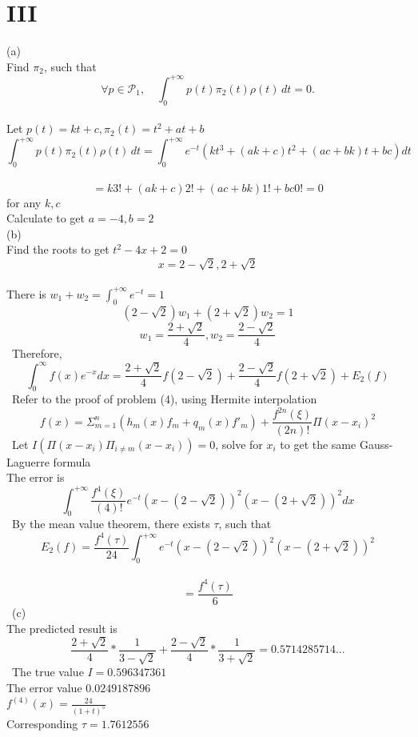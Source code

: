 \documentclass[a4paper]{article}
\begin{document}
\section*{III}
(a)\\
Find \(\pi_2\), such that\\
\[ \forall p \in \mathcal{P}_1, \quad \int_{0}^{+\infty} p(t) \pi_2(t) \rho(t) \, dt = 0. \]\\
Let \(p(t)=kt+c,\pi_2(t)=t^2+at+b\)\\
\[ \int_{0}^{+\infty} p(t) \pi_2(t) \rho(t) \, dt=\int_{0}^{+\infty} e^{-t} (kt^3+(ak+c)t^2+(ac+bk)t+bc)dt \]\\
\[ =k 3!+(ak+c)2!+(ac+bk)1!+bc0!=0 \] for any \(k,c\)\\
Calculate to get \(a=-4,b=2\)\\
(b)\\
Find the roots to get \(t^2-4x+2=0\)\\
\[ x=2-\sqrt{2},2+\sqrt{2} \]\\
There is \(w_1+w_2=\int_{0}^{+\infty}e^{-t}=1\)\\
\[ (2-\sqrt{2})w_1+(2+\sqrt{2})w_2=1\]
\[ w_1=\frac{2+\sqrt{2}}{4},w_2=\frac{2-\sqrt{2}}{4}\]\
Therefore,\\
\[ \int_{0}^{\infty}f(x)e^{-x}dx=\frac{2+\sqrt{2}}{4}f(2-\sqrt{2})+\frac{2-\sqrt{2}}{4}f(2+\sqrt{2})+E_2(f)\]\
Refer to the proof of problem (4), using Hermite interpolation\\
\[ f(x)=\Sigma_{m=1}^{n}(h_m(x)f_m+q_m(x)f'_m)+\frac{f^{2n}(\xi)}{(2n)!}\Pi(x-x_i)^2\]\
Let \(I(\Pi(x-x_i)\Pi_{i\neq m}(x-x_i))=0\), solve for \(x_i\) to get the same Gauss-Laguerre formula\\
The error is\\
\[ \int_{0}^{+\infty}\frac{f^{4}(\xi)}{(4)!}e^{-t}(x-(2-\sqrt{2}))^2(x-(2+\sqrt{2}))^2dx\]\
By the mean value theorem, there exists \(\tau\), such that\\
\[ E_2(f)=\frac{f^{4}(\tau)}{24}\int_{0}^{+\infty}e^{-t}(x-(2-\sqrt{2}))^2(x-(2+\sqrt{2}))^2\]\
\[ =\frac{f^{4}(\tau)}{6}\]\
(c)\\
The predicted result is\\
\[ \frac{2+\sqrt{2}}{4}*\frac{1}{3-\sqrt{2}}+\frac{2-\sqrt{2}}{4}*\frac{1}{3+\sqrt{2}}=0.5714285714...\]\
The true value \( I =0.596347361\)\\
The error value \(0.0249187896\)\\
\(f^{(4)}(x)=\frac{24}{(1+t)^5}\)\\
Corresponding \(\tau=1.7612556\)\\
\end{document}
